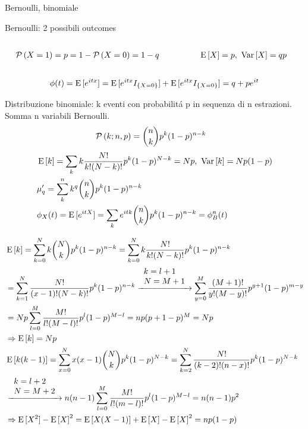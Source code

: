 \documentclass[asd-beamer.tex]{subfiles}
\begin{document}
\begin{frame}{Bernoulli, binomiale}
\begin{block}{Bernoulli: 2 possibili outcomes}
	\begin{columns}[T]
	\begin{column}{0.6\textwidth}
	\begin{align*}
	&\operatorname{\mathcal{P}}{(X=1)}=p=1-\operatorname{\mathcal{P}}{(X=0)}=1-q
	\end{align*}
	\end{column}
	\begin{column}{0.4\textwidth}
	\begin{align*}
	&\operatorname{E}{[X]}=p,\ \operatorname{Var}{[X]}=qp
	\end{align*}
	\end{column}
	\end{columns}
\[\phi(t)=\operatorname{E}{[e^{itx}]}=\operatorname{E}{[e^{itx}I_{\{X=0\}}]}+\operatorname{E}{[e^{itx}I_{\{X=0\}}]}=q+pe^{it}\]
\end{block}
\begin{block}{Distribuzione binomiale: k eventi con probabilit\'a p in sequenza di n estrazioni. Somma n variabili Bernoulli.}
\begin{align*}
&\operatorname{\mathcal{P}}{(k;n,p)}=\binom{n}{k}p^k(1-p)^{n-k}
\end{align*}
\begin{align*}
&\E{[k]}=\sum_kk\frac{N!}{k!(N-k)!}p^k(1-p)\expy{N-k}=Np,\ \var{[k]}=Np(1-p)\\
&\mu'_q=\sum_k^nk^q\binom{n}{k}p^k(1-p)^{n-k}\\
&\phi_X(t)=\E{[\exp{itX}]}=\sum_k\exp{itk}\binom{n}{k}p^k(1-p)^{n-k}=\phi_B^n(t)
\end{align*}
\end{block}
\end{frame}

\begin{frame}{}
\begin{align*}
&\operatorname{E}{[k]}=\sum_{k=0}^Nk\binom{N}{k}p^k(1-p)^{n-k}=\sum_{k=0}^Nk\frac{N!}{k!(N-k)!}p^k(1-p)^{n-k}\\
&=\sum_{k=1}^N\frac{N!}{(x-1)!(N-k)!}p^k(1-p)^{n-k}\xrightarrow{\begin{array}{l}k=l+1\\N=M+1\\\end{array}}\sum_{y=0}^M\frac{(M+1)!}{y!(M-y)!}p^{y+1}(1-p)^{m-y}\\
&=Np\sum_{l=0}^M\frac{M!}{l!(M-l)!}p^l(1-p)^{M-l}=np(p+1-p)^M=Np\\
&\Rightarrow\operatorname{E}{[k]}=Np\\
&\operatorname{E}{[k(k-1)]}=\sum_{x=0}^Nx(x-1)\binom{N}{k}p^k(1-p)^{N-k}=\sum_{k=2}^N\frac{N!}{(k-2)!(n-x)!}p^k(1-p)^{N-k}\\
&\xrightarrow{\begin{array}{l}k=l+2\\N=M+2\\\end{array}}n(n-1)\sum_{l=0}^M\frac{M!}{l!(m-l)!}p^l(1-p)^{M-l}=n(n-1)p^2\\
&\Rightarrow\operatorname{E}{[X^2]}-\operatorname{E}{[X]}^2=\operatorname{E}{[X(X-1)]}+\operatorname{E}{[X]}-\operatorname{E}{[X]}^2=np(1-p)
\end{align*}
\end{frame}
\end{document}
